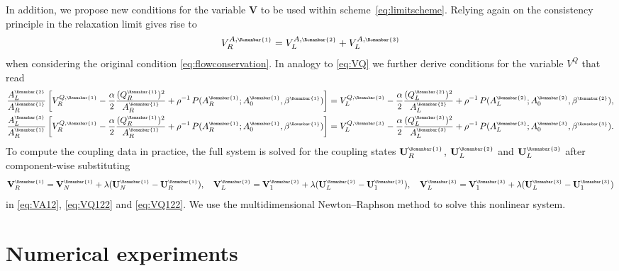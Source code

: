 \documentclass[a4paper,11pt]{article}
\newcommand{\rmn}[1]{\text{\tiny \Romanbar{#1}}}
\begin{document}
        In addition, we propose new conditions for the variable $\mathbf{V}$ to be used within scheme~\eqref{eq:limitscheme}. Relying again on the consistency principle in the relaxation limit gives rise to
        \begin{equation}\label{eq:VA12}
          V_R^{A,\rmn{1}}=V_L^{A,\rmn{2}} + V_L^{A,\rmn{3}} 
        \end{equation}
        when considering the original condition \eqref{eq:flowconservation}. In analogy to \eqref{eq:VQ} we further derive conditions for the variable $V^Q$ that read
        \begin{align}
          \frac{A_L^\rmn{2}}{A_R^\rmn{1}}\left[ V^{Q,\rmn{1}}_R - \frac{\alpha}{2} \frac{(Q_R^\rmn{1})^2}{A_R^\rmn{1}} +   \rho^{-1} \, P(A_R^\rmn{1}; A_0^{\rmn{1}}, \beta^{\rmn{1}}) \right]&= V^{Q,\rmn{2}}_L - \frac{\alpha}{2} \frac{(Q_L^\rmn{2})^2}{A_L^\rmn{2}} + \rho^{-1}\,P(A_L^\rmn{2}; A_0^{\rmn{2}}, \beta^{\rmn{2}}) , \label{eq:VQ121}\\
          \frac{A_L^\rmn{3}}{A_R^\rmn{1}}\left[ V^{Q,\rmn{1}}_R - \frac{\alpha}{2} \frac{(Q_R^\rmn{1})^2}{A_R^\rmn{1}} +   \rho^{-1} \, P(A_R^\rmn{1}; A_0^{\rmn{1}}, \beta^{\rmn{1}}) \right]&= V^{Q,\rmn{3}}_L - \frac{\alpha}{2} \frac{(Q_L^\rmn{3})^2}{A_L^\rmn{3}} + \rho^{-1}\,P(A_L^\rmn{3}; A_0^{\rmn{3}}, \beta^{\rmn{3}}). \label{eq:VQ122}
        \end{align}
        To compute the coupling data in practice, the full system is solved for the coupling states $\mathbf U_R^\rmn{1}$, $\mathbf U_L^\rmn{2}$ and $\mathbf U_L^\rmn{3}$ after component-wise substituting
        \begin{align*}
          \mathbf V_R^\rmn{1}= \mathbf V_N^\rmn{1}+ \lambda(\mathbf U_N^\rmn{1} - \mathbf U_R^\rmn{1}), \quad \mathbf V_L^\rmn{2}= \mathbf V_1^\rmn{2}+ \lambda(\mathbf U_L^\rmn{2} - \mathbf U_1^\rmn{2}), \quad \mathbf V_L^\rmn{3}= \mathbf V_1^\rmn{3}+ \lambda(\mathbf U_L^\rmn{3} - \mathbf U_1^\rmn{3}) 
        \end{align*}
        in \eqref{eq:VA12}, \eqref{eq:VQ122} and \eqref{eq:VQ122}. We use the multidimensional Newton--Raphson method to solve this nonlinear system. 


\section{Numerical experiments}\label{sec:exp}
\end{document}
